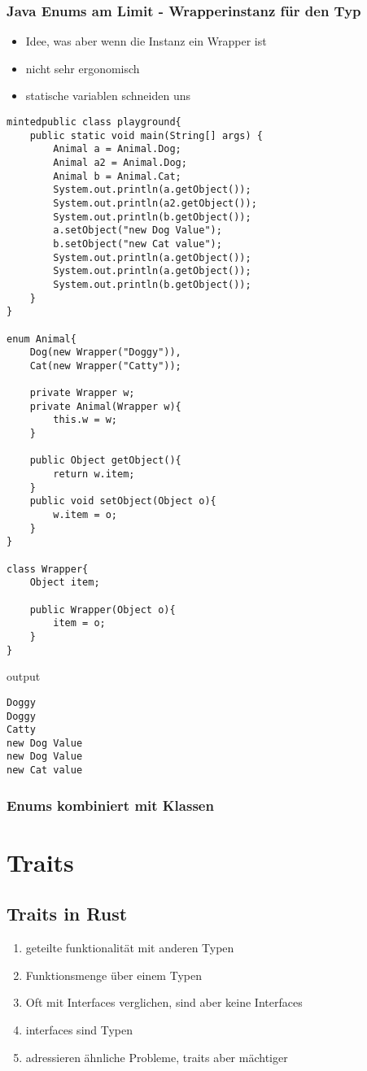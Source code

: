 \documentclass[a4paper, 1ppt]{article}
\begin{document}
\subsubsection{Java Enums am Limit - Wrapperinstanz für den Typ}
\begin{itemize}
	\item Idee, was aber wenn die Instanz ein Wrapper ist
	\item nicht sehr ergonomisch 
	\item statische variablen schneiden uns 
\end{itemize}
\begin{verbatim}
mintedpublic class playground{
	public static void main(String[] args) {
		Animal a = Animal.Dog;
		Animal a2 = Animal.Dog;
		Animal b = Animal.Cat;
		System.out.println(a.getObject());
		System.out.println(a2.getObject());
		System.out.println(b.getObject());
		a.setObject("new Dog Value");
		b.setObject("new Cat value");
		System.out.println(a.getObject());
		System.out.println(a.getObject());
		System.out.println(b.getObject());
	}
}

enum Animal{
	Dog(new Wrapper("Doggy")),
	Cat(new Wrapper("Catty"));

	private Wrapper w;
	private Animal(Wrapper w){
		this.w = w;
	}

	public Object getObject(){
		return w.item;
	}
	public void setObject(Object o){
		w.item = o;
	}
}

class Wrapper{
	Object item;

	public Wrapper(Object o){
		item = o;
	}
}
\end{verbatim}
output
\begin{verbatim}
Doggy
Doggy
Catty
new Dog Value
new Dog Value
new Cat value
\end{verbatim}
\subsubsection{Enums kombiniert mit Klassen}
\section{Traits}
\subsection{Traits in Rust}
\begin{enumerate}
	\item geteilte funktionalität mit anderen Typen
	\item Funktionsmenge über einem Typen
	\item Oft mit Interfaces verglichen, sind aber keine Interfaces
	\item interfaces sind Typen
	\item adressieren ähnliche Probleme, traits aber mächtiger
\end{enumerate}
\end{document}
